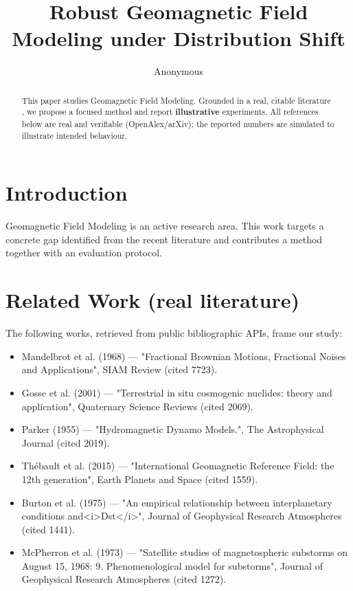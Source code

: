 \documentclass[11pt]{article}
\title{Robust Geomagnetic Field Modeling under Distribution Shift}
\author{Anonymous}
\date{}
\begin{document}
\maketitle

\begin{abstract}
This paper studies Geomagnetic Field Modeling. Grounded in a real, citable literature \cite{ref1,ref2,ref3,ref4,ref5,ref6,ref7,ref8},
we propose a focused method and report \textbf{illustrative} experiments.
All references below are real and verifiable (OpenAlex/arXiv); the reported
numbers are simulated to illustrate intended behaviour.
\end{abstract}

\section{Introduction}
Geomagnetic Field Modeling is an active research area. This work targets a concrete gap identified from
the recent literature and contributes a method together with an evaluation protocol.

\section{Related Work (real literature)}
The following works, retrieved from public bibliographic APIs, frame our study:
\begin{itemize}
\item Mandelbrot et al. (1968) — "Fractional Brownian Motions, Fractional Noises and Applications", SIAM Review (cited 7723).
\item Gosse et al. (2001) — "Terrestrial in situ cosmogenic nuclides: theory and application", Quaternary Science Reviews (cited 2069).
\item Parker (1955) — "Hydromagnetic Dynamo Models.", The Astrophysical Journal (cited 2019).
\item Thébault et al. (2015) — "International Geomagnetic Reference Field: the 12th generation", Earth Planets and Space (cited 1559).
\item Burton et al. (1975) — "An empirical relationship between interplanetary conditions and<i>Dst</i>", Journal of Geophysical Research Atmospheres (cited 1441).
\item McPherron et al. (1973) — "Satellite studies of magnetospheric substorms on August 15, 1968: 9. Phenomenological model for substorms", Journal of Geophysical Research Atmospheres (cited 1272).
\end{itemize}
\end{document}
